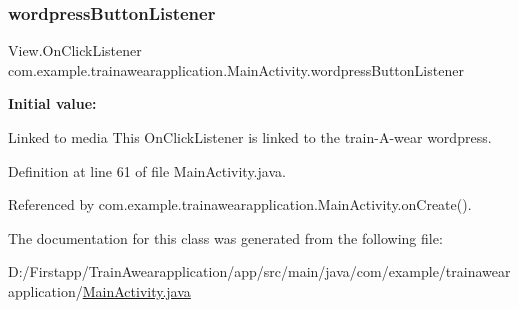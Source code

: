 \subsubsection{\texorpdfstring{wordpressButtonListener}{wordpressButtonListener}}
{\footnotesize\ttfamily View.\+On\+Click\+Listener com.\+example.\+trainawearapplication.\+Main\+Activity.\+wordpress\+Button\+Listener\hspace{0.3cm}{\ttfamily [private]}}

{\bfseries Initial value\+:}
\begin{DoxyCode}{0}
\DoxyCodeLine{        \}}
\DoxyCodeLine{    \}}

\end{DoxyCode}


Linked to media This On\+Click\+Listener is linked to the train-\/\+A-\/wear wordpress. 



Definition at line 61 of file Main\+Activity.\+java.



Referenced by com.\+example.\+trainawearapplication.\+Main\+Activity.\+on\+Create().



The documentation for this class was generated from the following file\+:\begin{DoxyCompactItemize}
\item 
D\+:/\+Firstapp/\+Train\+Awearapplication/app/src/main/java/com/example/trainawearapplication/\mbox{\hyperlink{_main_activity_8java}{Main\+Activity.\+java}}\end{DoxyCompactItemize}
